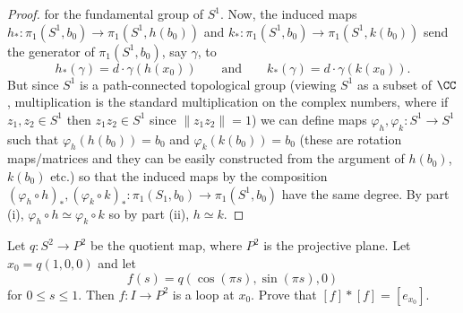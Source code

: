 \begin{proof}
for the fundamental group of $S^1$. Now, the induced maps
$h_*\colon\pi_1(S^1,b_0)\to\pi_1(S^1,h(b_0))$ and
$k_*\colon\pi_1(S^1,b_0)\to\pi_1(S^1,k(b_0))$ send the generator of
$\pi_1(S^1,b_0)$, say $\gamma$, to
\[
h_*(\gamma)=d\cdot\gamma(h(x_0))\qquad\text{and}\qquad
k_*(\gamma)=d\cdot\gamma(k(x_0)).
\]
But since $S^1$ is a path-connected topological group (viewing $S^1$ as a
subset of $\CC$, multiplication is the standard multiplication on the
complex numbers, where if $z_1,z_2\in S^1$ then $z_1z_2\in S^1$ since
$\|z_1z_2\|=1$) we can define maps $\varphi_h,\varphi_k\colon S^1\to S^1$
such that $\varphi_h(h(b_0))=b_0$ and $\varphi_k(k(b_0))=b_0$ (these are
rotation maps/matrices and they can be easily constructed from the argument
of $h(b_0)$, $k(b_0)$ etc.) so that the induced maps by the composition
$(\varphi_h\circ h)_*,(\varphi_k\circ
k)_*\colon\pi_1(S_1,b_0)\to\pi_1(S^1,b_0)$ have the same degree. By part
(i), $\varphi_h\circ h\simeq\varphi_k\circ k$ so by part (ii), $h\simeq k$.
\end{proof}
\newpage
\begin{problem}[B]
Let $q\colon S^2\to P^2$ be the quotient map, where $P^2$ is the
projective plane. Let $x_0=q(1,0,0)$ and let
\[f(s)=q(\cos(\pi s),\sin(\pi s),0)\]
for $0\leq s\leq 1$. Then $f\colon I\to P^2$ is a loop at
$x_0$. Prove that $[f]*[f]=[e_{x_0}]$.
\end{problem}
